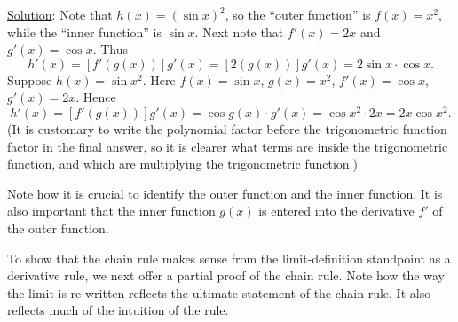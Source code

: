 \underline{Solution}: Note that $h(x)=(\sin x)^2$, so the
``outer function'' is $f(x)=x^2$, while the ``inner function''
is $\sin x$.  Next note that $f'(x)=2x$ and $g'(x)=\cos x$.  Thus
$$h'(x)=[f'(g(x))]g'(x)=[2(g(x))]g'(x)=2\sin x\cdot\cos x.$$
\eex
\bex Suppose $h(x)=\sin x^2$.  Here $f(x)=\sin x$, $g(x)=x^2$,
$f'(x)=\cos x$, $g'(x)=2x$.  Hence
$$h'(x)=[f'(g(x))]g'(x)=\cos g(x)\cdot g'(x)=\cos x^2\cdot2x=2x\cos x^2.$$
(It is customary to write the polynomial factor before the trigonometric
function factor in the final answer, 
so it is clearer what terms are inside the trigonometric
function, and which are multiplying the trigonometric function.)
\label{SinXXWithPrimes}\eex

Note how it is crucial to identify the outer function and the inner function.
It is also important that the inner function $g(x)$ is entered into
the derivative $f'$ of the outer function.  

To show that the chain rule makes sense from the limit-definition
standpoint as a derivative rule, we next offer a partial proof
of the chain rule.  Note how the way the limit is re-written reflects
the ultimate statement of the chain rule.  It also reflects much of the
intuition of the rule.


